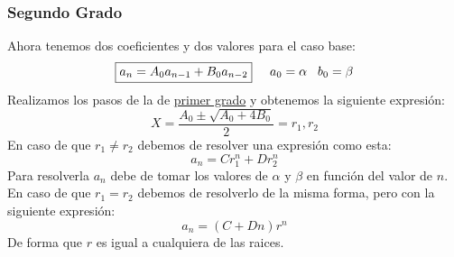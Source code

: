 \subsubsection{Segundo Grado}
\noindent Ahora tenemos dos coeficientes y dos valores para el caso base:
\[
        \boxed{a_n = A_0 a_{n-1} + B_0 a_{n-2}} \hspace{5mm} a_0 = \alpha \hspace{3mm} b_0 = \beta
\]
\noindent Realizamos los pasos de la de \underline{primer grado} y obtenemos la siguiente expresión:
\[
        \boxed{X = \frac{A_0 \pm \sqrt{A_0 +4B_0}}{2} = r_1,r_2}
\]
\noindent En caso de que \(r_1 \neq r_2\) debemos de resolver una expresión como esta:
\[
        \boxed{a_n = Cr^n_1 +Dr_2^n}
\]
\noindent Para resolverla \(a_n\) debe de tomar los valores de \(\alpha\) y \(\beta\) en función del valor de \(n\).\\
En caso de que \(r_1 = r_2\) debemos de resolverlo de la misma forma, pero con la siguiente expresión:
\[
        \boxed{ a_n = (C+Dn)r^n}
\]
\noindent De forma que \(r\) es igual a cualquiera de las raices.